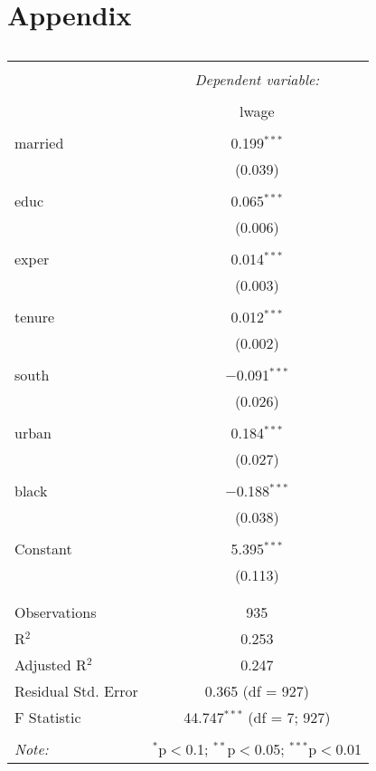 \documentclass[11pt]{article} %
\begin{document}
\section{Appendix}
\begin{table}[!htbp] \centering 
    \caption{} 
    \label{Question1}
  \begin{tabular}{@{\extracolsep{5pt}}lc} 
  \\[-1.8ex]\hline 
  \hline \\[-1.8ex] 
   & \multicolumn{1}{c}{\textit{Dependent variable:}} \\ 
  \cline{2-2} 
  \\[-1.8ex] & lwage \\ 
  \hline \\[-1.8ex] 
   married & 0.199$^{***}$ \\ 
    & (0.039) \\ 
    & \\ 
   educ & 0.065$^{***}$ \\ 
    & (0.006) \\ 
    & \\ 
   exper & 0.014$^{***}$ \\ 
    & (0.003) \\ 
    & \\ 
   tenure & 0.012$^{***}$ \\ 
    & (0.002) \\ 
    & \\ 
   south & $-$0.091$^{***}$ \\ 
    & (0.026) \\ 
    & \\ 
   urban & 0.184$^{***}$ \\ 
    & (0.027) \\ 
    & \\ 
   black & $-$0.188$^{***}$ \\ 
    & (0.038) \\ 
    & \\ 
   Constant & 5.395$^{***}$ \\ 
    & (0.113) \\ 
    & \\ 
  \hline \\[-1.8ex] 
  Observations & 935 \\ 
  R$^{2}$ & 0.253 \\ 
  Adjusted R$^{2}$ & 0.247 \\ 
  Residual Std. Error & 0.365 (df = 927) \\ 
  F Statistic & 44.747$^{***}$ (df = 7; 927) \\ 
  \hline 
  \hline \\[-1.8ex] 
  \textit{Note:}  & \multicolumn{1}{r}{$^{*}$p$<$0.1; $^{**}$p$<$0.05; $^{***}$p$<$0.01} \\ 
  \end{tabular} 
  \end{table}
\end{document}
